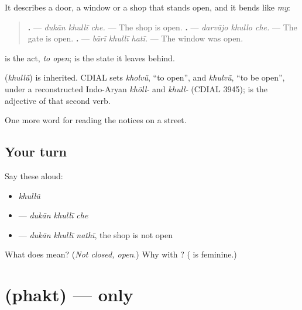 It describes a door, a window or a shop that stands open, and it bends like \emph{my}:

\begin{quote}
\textbf{  .} — \emph{dukān khullī che.} — The shop is open. \textbf{  .} — \emph{darvājo khullo che.} — The gate is open. \textbf{  .} — \emph{bārī khullī hatī.} — The window was open.
\end{quote}

\textbf{} is the act, \emph{to open}; \textbf{} is the state it leaves behind.

\begin{cousinweb}
\textbf{} (\emph{khullũ}) is inherited. CDIAL sets \textbf{} \emph{kholvũ}, \textquotedblleft{}to open\textquotedblright{}, and \emph{khulvũ}, \textquotedblleft{}to be open\textquotedblright{}, under a reconstructed Indo-Aryan \emph{khōll-} and \emph{khull-} (CDIAL 3945); \textbf{} is the adjective of that second verb.
\end{cousinweb}

\begin{grammarlens}[title={What you've built}]
One more word for reading the notices on a street.
\end{grammarlens}

\subsection*{Your turn}
Say these aloud:

\begin{itemize}
\raggedright
  \item \emph{khullũ}
  \item \textbf{  } — \emph{dukān khullī che}
  \item \textbf{  } — \emph{dukān khullī nathī}, the shop is not open
\end{itemize}

\begin{tcolorbox}[breakable,colback=teal!4,colframe=teal!35!black,title={Before you move on}]
What does \textbf{} mean? (\emph{Not closed, open}.) Why \textbf{} with \textbf{}? (\textbf{} is feminine.)
\end{tcolorbox}
\section[\texorpdfstring{\gu{ફક્ત} (phakt)}{ફક્ત (phakt)}]{ (phakt) — only}

